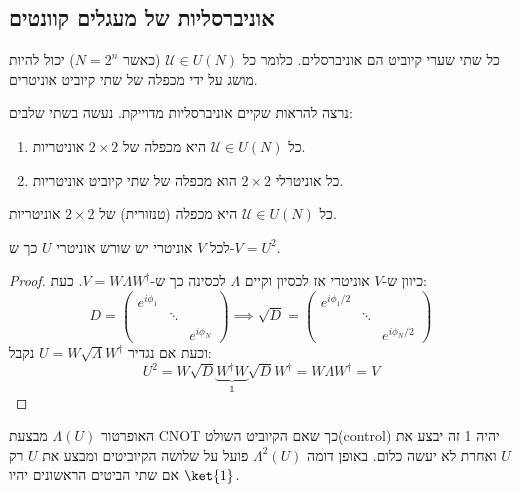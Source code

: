 \documentclass{tstextbook}
\begin{document}
\subsection{אוניברסליות של מעגלים קוונטים}

\begin{definition}
כל שתי שערי קיוביט הם אוניברסלים. כלומר כל \(\mathcal{U}\in U(N)\) (כאשר \(N=2^{n}\)) יכול להיות מושג על ידי מכפלה של שתי קיוביט אוניטרים.

\end{definition}
נרצה להראות שקיים אוניברסליות מדוייקת. נעשה בשתי שלבים:

\begin{enumerate}
  \item כל \(\mathcal{U}\in U(N)\) היא מכפלה של \(2\times 2\) אוניטריות. 


  \item כל אוניטרלי \(2\times 2\) הוא מכפלה של שתי קיוביט אוניטריות. 


\end{enumerate}
\begin{proposition}
כל \(\mathcal{U}\in U(N)\) היא מכפלה (טנזורית) של \(2\times 2\) אוניטריות.

\end{proposition}
\begin{proposition}
לכל \(V\) אוניטרי יש שורש אוניטרי \(U\) כך ש-\(V=U^{2}\).

\end{proposition}
\begin{proof}
כיוון ש-\(V\) אוניטרי אז לכסיון וקיים \(\Lambda\) לכסינה כך ש-\(V=W\Lambda W^{\dagger}\). כעת:
$$D=\begin{pmatrix}e^{ i\phi_{1}} &  &  \\ & \ddots &  \\ &  & e^{ i\phi_{N} }\end{pmatrix}\implies\sqrt{ D }=\begin{pmatrix}e^{ i\phi_{1}/2} &  &  \\ & \ddots &  \\ &  & e^{ i\phi_{N}/2 }
\end{pmatrix}$$
וכעת אם נגדיר \(U=W\sqrt{ \Lambda }W^{\dagger}\) נקבל:
$$U^{2}=W\sqrt{ D }\underbrace{ W^{\dagger}W }_{ \mathbb{1}  } \sqrt{ D }W^{\dagger}=W\Lambda W^{\dagger}=V$$

\end{proof}
\begin{reminder}
האופרטור \(\Lambda(U)\) מבצעת CNOT כך שאם הקיוביט השולט(control) יהיה 1 זה יבצע את \(U\) ואחרת לא יעשה כלום. באופן דומה \(\Lambda^{2}(U)\) פועל על שלושה הקיוביטים ומבצע את \(U\) רק אם שתי הביטים הראשונים יהיו \(\ket{1}\).

\end{reminder}
\end{document}
